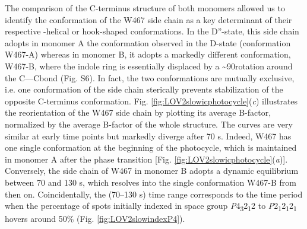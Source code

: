 \newline The comparison of the C-terminus structure of both monomers allowed us to identify the conformation of the W467 side chain as a key determinant of their respective \textalpha-helical or hook-shaped conformations. In the D''-state, this side chain adopts in monomer A the conformation observed in the D-state (conformation W467-A) whereas in monomer B, it adopts a markedly different conformation, W467-B, where the indole ring is essentially displaced by a \textasciitilde 90\degree  rotation around the C\textalpha—C\textbeta  bond (Fig. S6). In fact, the two conformations are mutually exclusive, i.e. one conformation of the side chain sterically prevents stabilization of the opposite C-terminus conformation. Fig. \ref{fig:LOV2slowicphotocycle}(\textit{c}) illustrates the reorientation of the W467 side chain by plotting its average B-factor, normalized by the average B-factor of the whole structure. The curves are very similar at early time points but markedly diverge after 70 s. Indeed, W467 has one single conformation at the beginning of the photocycle, which is maintained in monomer A after the phase transition [Fig. \ref{fig:LOV2slowicphotocycle}(\textit{a})]. Conversely, the side chain of W467 in monomer B adopts a dynamic equilibrium between 70 and 130 s, which resolves into the single conformation W467-B from then on. Coincidentally, the (70–130 s) time range corresponds to the time period when the percentage of spots initially indexed in space group \textit{P}4\textsubscript{3}2\textsubscript{1}2 to \textit{P}2\textsubscript{1}2\textsubscript{1}2\textsubscript{1} hovers around 50\% (Fig. \ref{fig:LOV2slowindexP4}).
